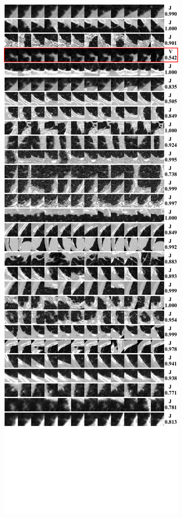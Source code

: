 \documentclass[onecolumn]{IEEEtran}
\begin{document}
\begin{figure}[H]
{\includegraphics[width=0.45\columnwidth]{./images/elcap-msnodules-wall3}
}
\end{figure}

\newpage
\end{document}
